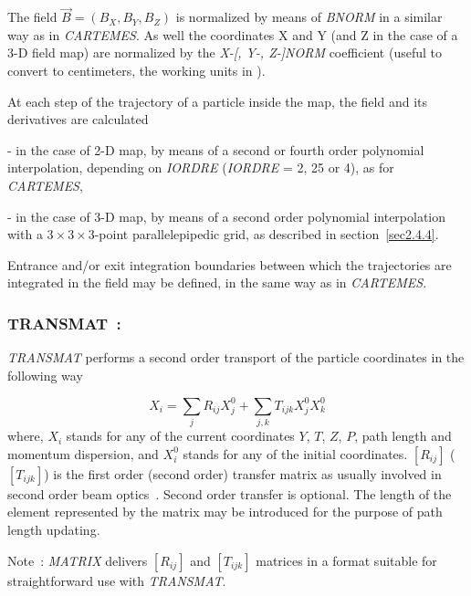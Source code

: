 \medskip


\noindent The field $ \vec  B=(B_X,B_Y,B_Z) $ is normalized by means of 
\textsl{BNORM} in a similar way as in \textsl{CARTEMES}.  
 As well the  coordinates  X and Y (and Z in the case of a 3-D field map) are normalized by  the
  \textsl{X-[, Y-, Z-]NORM} coefficient (useful to convert to centimeters, the working units in  \zgoubi). 

\medskip

\noindent At each step of the trajectory of a particle inside the map, the
field and its derivatives are calculated 

 - in the case of 2-D map,  by means of a second or fourth order polynomial interpolation, 
depending on \textsl{IORDRE} (\textsl{IORDRE} = 2, 25 or 4), as for 
\textsl{CARTEMES}, 

 - in the case of 3-D map, by means of a second order polynomial interpolation with a 
$3  \times   3   \times   3$-point parallelepipedic grid, as described in 
section~\ref{sec2.4.4}. 
\medskip

\noindent Entrance and/or exit integration boundaries between which the trajectories
are integrated in the field may be defined, in the same way as in  \textsl{CARTEMES}. 





\newpage

\subsubsection*{TRANSMAT~:  \TRANSMATTitl}\label{TRANSMAT}
\medskip

\textsl{TRANSMAT} performs a second order transport of the particle coordinates 
in the following way 

$$ X_i = \sum_j R_{ij}X^0_j + \sum_{j,k} T_{ijk}X^0_jX^0_k $$
%
 where, $ X_i $ stands for any of the current coordinates $ Y$, $T$, $Z$, $P $, path length and 
momentum dispersion, and $ X^0_i $ stands for any of the initial coordinates.
$[R_{ij}]$ ($[T_{ijk}]$) is the first order (second order) 
transfer matrix as usually involved in second order beam optics~\cite{Biblio10}.      %
Second order transfer is optional.  The length of the element represented by 
the matrix may be introduced for the purpose of path length updating.  

\bigskip

\noindent Note~: \textsl{MATRIX} delivers $[R_{ij}]$ and $[T_{ijk}]$ matrices in a format 
suitable for straightforward use with \textsl{TRANSMAT}.




